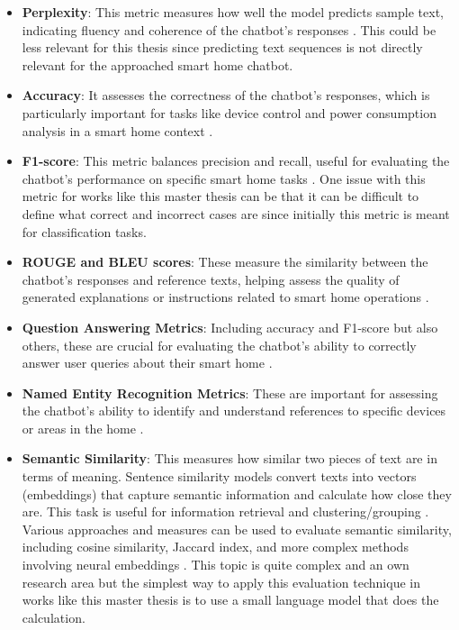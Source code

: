 \begin{itemize}
\item \textbf{Perplexity}: This metric measures how well the model predicts sample text, indicating fluency and coherence of the chatbot's responses \cite{biswas2023evaluating}. This could be less relevant for this thesis since predicting text sequences is not directly relevant for the approached smart home chatbot.

\item \textbf{Accuracy}: It assesses the correctness of the chatbot's responses, which is particularly important for tasks like device control and power consumption analysis in a smart home context \cite{biswas2023evaluating}.

\item \textbf{F1-score}: This metric balances precision and recall, useful for evaluating the chatbot's performance on specific smart home tasks \cite{biswas2023evaluating}. One issue with this metric for works like this master thesis can be that it can be difficult to define what correct and incorrect cases are since initially this metric is meant for classification tasks.

\item \textbf{ROUGE and BLEU scores}: These measure the similarity between the chatbot's responses and reference texts, helping assess the quality of generated explanations or instructions related to smart home operations \cite{biswas2023evaluating}.

\item \textbf{Question Answering Metrics}: Including accuracy and F1-score but also others, these are crucial for evaluating the chatbot's ability to correctly answer user queries about their smart home \cite{biswas2023evaluating}.

\item \textbf{Named Entity Recognition Metrics}: These are important for assessing the chatbot's ability to identify and understand references to specific devices or areas in the home \cite{biswas2023evaluating}.

\item \textbf{Semantic Similarity}: This measures how similar two pieces of text are in terms of meaning. Sentence similarity models convert texts into vectors (embeddings) that capture semantic information and calculate how close they are. This task is useful for information retrieval and clustering/grouping \cite{huggingface_sentence_similarity}. Various approaches and measures can be used to evaluate semantic similarity, including cosine similarity, Jaccard index, and more complex methods involving neural embeddings \cite{Slimani_2013}. This topic is quite complex and an own research area but the simplest way to apply this evaluation technique in works like this master thesis is to use a small language model that does the calculation.
\end{itemize}

